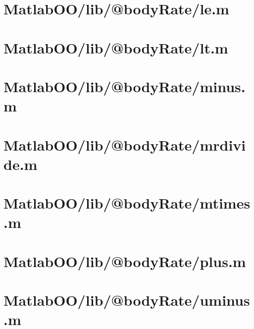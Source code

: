 \pagebreak
\section{MatlabOO/lib/@bodyRate/le.m}\label{code:MatlabOO/lib/@bodyRate/le.m}


\pagebreak
\section{MatlabOO/lib/@bodyRate/lt.m}\label{code:MatlabOO/lib/@bodyRate/lt.m}


\pagebreak
\section{MatlabOO/lib/@bodyRate/minus.m}\label{code:MatlabOO/lib/@bodyRate/minus.m}


\pagebreak
\section{MatlabOO/lib/@bodyRate/mrdivide.m}\label{code:MatlabOO/lib/@bodyRate/mrdivide.m}


\pagebreak
\section{MatlabOO/lib/@bodyRate/mtimes.m}\label{code:MatlabOO/lib/@bodyRate/mtimes.m}


\pagebreak
\section{MatlabOO/lib/@bodyRate/plus.m}\label{code:MatlabOO/lib/@bodyRate/plus.m}


\pagebreak
\section{MatlabOO/lib/@bodyRate/uminus.m}\label{code:MatlabOO/lib/@bodyRate/uminus.m}


